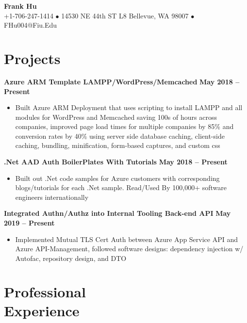 \documentclass[margin,line]{resume}
\begin{document}
	{\centering \LARGE{\textbf{Frank Hu}}}
	\\
	\normalsize
	+1-706-247-1414 $\bullet$ 14530 NE 44th ST L8 Bellevue, WA 98007 $\bullet$ FHu004@Fiu.Edu
	
	\begin{resume}	
		
	
	\section{\mysidestyle Projects}
	
	\textbf{Azure ARM Template LAMPP/WordPress/Memcached}  \hfill \textbf{May 2018 -- Present}
	\vspace{1mm}
	\begin{itemize}
		\item Built Azure ARM Deployment that uses scripting to install LAMPP and all modules for WordPress and Memcached saving 100s of hours across companies, improved page load times for multiple companies by 85\% and conversion rates by 40\% using server side database caching, client-side caching, bundling, minification, form-based captures, and custom css
	\end{itemize}

	\textbf{.Net AAD Auth BoilerPlates With Tutorials}  \hfill \textbf{May 2018 -- Present}
	\vspace{1mm}
	\begin{itemize}
		\item Built out .Net code samples for Azure customers with corresponding blogs/tutorials for each .Net sample. Read/Used By 100,000+ software engineers internationally
	\end{itemize}
	
	\textbf{Integrated Authn/Authz into Internal Tooling Back-end API}  \hfill \textbf{May 2019 -- Present}
	\vspace{1mm}
	\begin{itemize}
		\item Implemented Mutual TLS Cert Auth between Azure App Service API and Azure API-Management, followed software designs: dependency injection w/ Autofac, repository design, and DTO
	\end{itemize}
		
	\section{\mysidestyle Professional\\Experience}
	

\end{resume}
\end{document}
